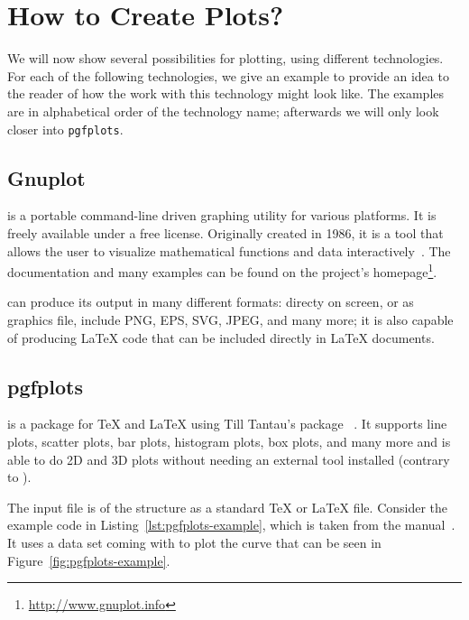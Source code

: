 \section{How to Create Plots?}

We will now show several possibilities for plotting, using different
technologies. For each of the following technologies, we give an example to
provide an idea to the reader of how the work with this technology might look
like. The examples are in alphabetical order of the technology name; afterwards
we will only look closer into \texttt{pgfplots}.

\subsection{Gnuplot}

 is a portable command-line driven graphing utility for
various platforms.  It is freely available under a free license.  Originally
created in 1986, it is a tool that allows the user to visualize mathematical
functions and data interactively~\cite{WilliamsKelley2016}.  The documentation
and many examples can be found on the project's
homepage\footnote{\href{http://www.gnuplot.info}{http://www.gnuplot.info}}.

 can produce its output in many different formats: directy on
screen, or as graphics file, include PNG, EPS, SVG, JPEG, and many more; it is
also capable of producing \LaTeX{} code that can be included directly in
\LaTeX{} documents.

\subsection{pgfplots}

 is a package for \TeX{} and \LaTeX{} using Till Tantau's
package ~\cite{Feuersaenger2016}.  It supports line
plots, scatter plots, bar plots, histogram plots, box plots, and many more and
is able to do 2D and 3D plots without needing an external tool installed
(contrary to ).

The input file is of the structure as a standard \TeX{} or \LaTeX{} file.
Consider the example code in Listing~\ref{lst:pgfplots-example}, which is taken
from the  manual~\cite{Feuersaenger2016}.  It uses a data set
coming with  to plot the curve that can be seen in
Figure~\ref{fig:pgfplots-example}.

